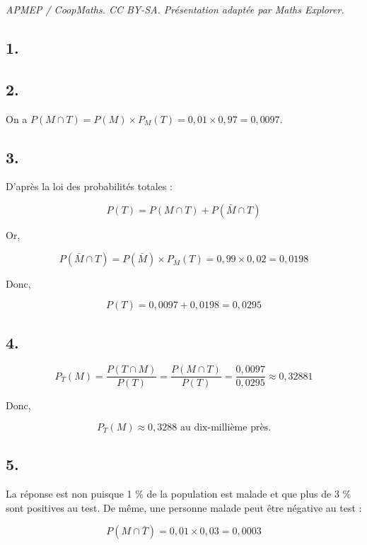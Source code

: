 \documentclass[10pt]{article}
\begin{document}
\noindent\textit{APMEP / CoopMaths. CC BY-SA. Présentation adaptée par Maths Explorer.}\par\medskip
\subsection*{1.}
	
	
	\subsection*{2.}
	
	
	On a \(P(M \cap T) = P(M) \times P_M(T) = 0,01 \times 0,97 = 0,0097\).
	
	\subsection*{3.}
	
	D'après la loi des probabilités totales :
	
	\[ P(T) = P(M \cap T) + P(\bar{M} \cap T) \]
	
	Or,
	
	\[ P(\bar{M} \cap T) = P(\bar{M}) \times P_{\bar{M}}(T) = 0,99 \times 0,02 = 0,0198 \]
	
	Donc,
	
	\[ P(T) = 0,0097 + 0,0198 = 0,0295 \]
	
	\subsection*{4.}
		
	
	\[ P_T(M) = \dfrac{P(T \cap M)}{P(T)} = \dfrac{P(M \cap T)}{P(T)} = \dfrac{0,0097}{0,0295} \approx 0,32881 \]
	
	Donc,
	
	\[ P_T(M) \approx 0,3288 \text{ au dix-millième près.} \]
	
	\subsection*{5.}
	
		La réponse est non puisque 1 \% de la population est malade et que plus de 3 \% sont positives au test. De même, une personne malade peut être négative au test :
	
	\[ P(M \cap \bar{T}) = 0,01 \times 0,03 = 0,0003 \]
\end{document}
